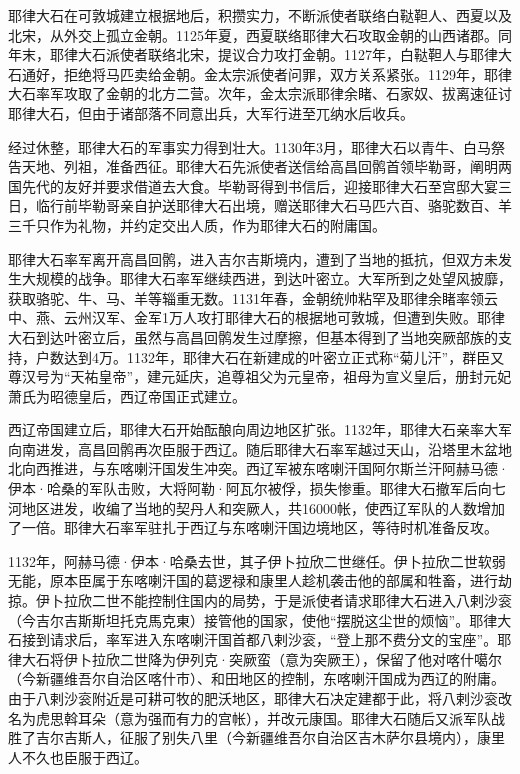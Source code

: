 耶律大石在可敦城建立根据地后，积攒实力，不断派使者联络白鞑靼人、西夏以及北宋，从外交上孤立金朝。1125年夏，西夏联络耶律大石攻取金朝的山西诸郡。同年末，耶律大石派使者联络北宋，提议合力攻打金朝。1127年，白鞑靼人与耶律大石通好，拒绝将马匹卖给金朝。金太宗派使者问罪，双方关系紧张。1129年，耶律大石率军攻取了金朝的北方二营。次年，金太宗派耶律余睹、石家奴、拔离速征讨耶律大石，但由于诸部落不同意出兵，大军行进至兀纳水后收兵。

经过休整，耶律大石的军事实力得到壮大。1130年3月，耶律大石以青牛、白马祭告天地、列祖，准备西征。耶律大石先派使者送信给高昌回鹘首领毕勒哥，阐明两国先代的友好并要求借道去大食。毕勒哥得到书信后，迎接耶律大石至宫邸大宴三日，临行前毕勒哥亲自护送耶律大石出境，赠送耶律大石马匹六百、骆驼数百、羊三千只作为礼物，并约定交出人质，作为耶律大石的附庸国。

耶律大石率军离开高昌回鹘，进入吉尔吉斯境内，遭到了当地的抵抗，但双方未发生大规模的战争。耶律大石率军继续西进，到达叶密立。大军所到之处望风披靡，获取骆驼、牛、马、羊等辎重无数。1131年春，金朝统帅粘罕及耶律余睹率领云中、燕、云州汉军、金军1万人攻打耶律大石的根据地可敦城，但遭到失败。耶律大石到达叶密立后，虽然与高昌回鹘发生过摩擦，但基本得到了当地突厥部族的支持，户数达到4万。1132年，耶律大石在新建成的叶密立正式称“菊儿汗”，群臣又尊汉号为“天祐皇帝”，建元延庆，追尊祖父为元皇帝，祖母为宣义皇后，册封元妃萧氏为昭德皇后，西辽帝国正式建立。

西辽帝国建立后，耶律大石开始酝酿向周边地区扩张。1132年，耶律大石亲率大军向南进发，高昌回鹘再次臣服于西辽。随后耶律大石率军越过天山，沿塔里木盆地北向西推进，与东喀喇汗国发生冲突。西辽军被东喀喇汗国阿尔斯兰汗阿赫马德·伊本·哈桑的军队击败，大将阿勒·阿瓦尔被俘，损失惨重。耶律大石撤军后向七河地区进发，收编了当地的契丹人和突厥人，共16000帐，使西辽军队的人数增加了一倍。耶律大石率军驻扎于西辽与东喀喇汗国边境地区，等待时机准备反攻。

1132年，阿赫马德·伊本·哈桑去世，其子伊卜拉欣二世继任。伊卜拉欣二世软弱无能，原本臣属于东喀喇汗国的葛逻禄和康里人趁机袭击他的部属和牲畜，进行劫掠。伊卜拉欣二世不能控制住国内的局势，于是派使者请求耶律大石进入八剌沙衮（今吉尔吉斯斯坦托克馬克東）接管他的国家，使他“摆脱这尘世的烦恼”。耶律大石接到请求后，率军进入东喀喇汗国首都八剌沙衮，“登上那不费分文的宝座”。耶律大石将伊卜拉欣二世降为伊列克·突厥蛮（意为突厥王），保留了他对喀什噶尔（今新疆维吾尔自治区喀什市）、和田地区的控制，东喀喇汗国成为西辽的附庸。由于八剌沙衮附近是可耕可牧的肥沃地区，耶律大石决定建都于此，将八剌沙衮改名为虎思斡耳朵（意为强而有力的宫帐），并改元康国。耶律大石随后又派军队战胜了吉尔吉斯人，征服了别失八里（今新疆维吾尔自治区吉木萨尔县境内），康里人不久也臣服于西辽。

